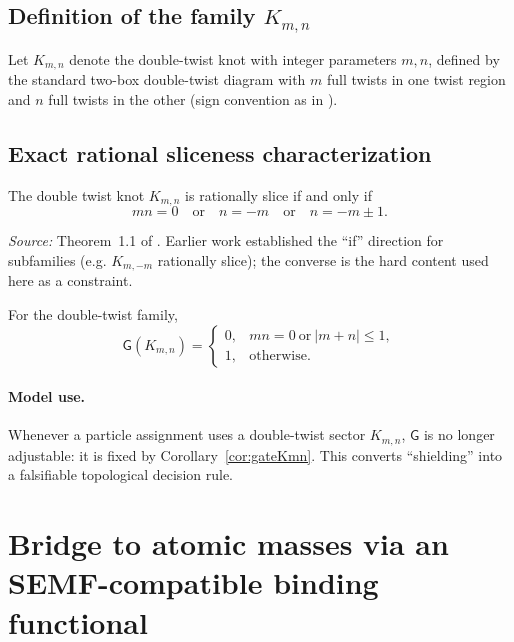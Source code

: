 \documentclass[11pt, a4paper]{article}
\begin{document}
\subsection{Definition of the family \(K_{m,n}\)}
\begin{definition}\label{def:Kmn}
Let \(K_{m,n}\) denote the double-twist knot with integer parameters \(m,n\), defined by the standard two-box double-twist diagram with
\(m\) full twists in one twist region and \(n\) full twists in the other (sign convention as in \cite{Lee2025DoubleTwist}).
\end{definition}

\subsection{Exact rational sliceness characterization}
\begin{theorem}\label{thm:rationalsliceKmn}
The double twist knot \(K_{m,n}\) is rationally slice if and only if
\[
mn=0 \quad\text{or}\quad n=-m \quad\text{or}\quad n=-m\pm 1.
\]
\end{theorem}
\noindent\emph{Source:} Theorem~1.1 of \cite{Lee2025DoubleTwist}.  Earlier work established the ``if'' direction for
subfamilies (e.g. \(K_{m,-m}\) rationally slice); the converse is the hard content used here as a constraint.

\begin{corollary}\label{cor:gateKmn}
For the double-twist family,
\[
\mathsf{G}(K_{m,n})=
\begin{cases}
0,& mn=0\ \text{or}\ |m+n|\le 1,\\
1,& \text{otherwise.}
\end{cases}
\]
\end{corollary}

\paragraph{Model use.}
Whenever a particle assignment uses a double-twist sector \(K_{m,n}\), \(\mathsf{G}\) is no longer adjustable: it is fixed by
Corollary~\ref{cor:gateKmn}. This converts ``shielding'' into a falsifiable topological decision rule.

\section{Bridge to atomic masses via an SEMF-compatible binding functional}\label{sec:semf}
\end{document}

